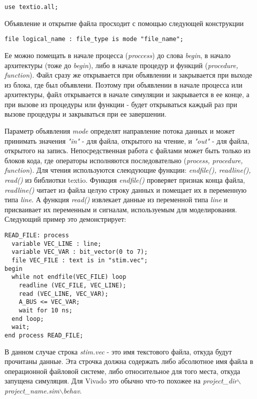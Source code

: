 \begin{lstlisting}
use textio.all;
\end{lstlisting}

Объявление и открытие файла просходит с помощью следующей конструкции

\begin{lstlisting}
file logical_name : file_type is mode "file_name";
\end{lstlisting}

Ее можно помещать в начале процесса (\emph{proccess}) до слова \emph{begin}, в начало архитектуры (тоже до \emph{begin}), либо в начале процедур и функций (\emph{procedure, function}). Файл сразу же открывается при объявлении и закрывается при выходе из блока, где был объявлени. Поэтому при объявлении в начале процесса или архитектуры, файл открывается в начале симуляции и закрывается в ее конце, а при вызове из процедуры или функции - будет открываться каждый раз при вызове процедуры и закрываться при ее завершении.

Параметр объявления \emph{mode} определят направление потока данных и может принимать значения \emph{"in"} - для файла, открытого на чтение, и \emph{"out"} - для файла, открытого на запись. Непосредственная работа с файлами может быть только из блоков кода, где операторы исполняются последовательно (\emph{process, procedure, function}). Для чтения используются слеюдующие функции: \emph{endfile(), readline(), read()} из библиотки textio. Функция \emph{endfile()} проверяет признак конца файла, \emph{readline()} читает из файла целую строку данных и помещает их в переменную типа \emph{line}. А функция \emph{read()} извлекает данные из переменной типа \emph{line} и присваивает их переменным и сигналам, используемым для моделирования. Следующий пример это демонстрирует:

\begin{Code}
\begin{lstlisting}
READ_FILE: process
  variable VEC_LINE : line;
  variable VEC_VAR : bit_vector(0 to 7);
  file VEC_FILE : text is in "stim.vec";
begin
  while not endfile(VEC_FILE) loop
    readline (VEC_FILE, VEC_LINE);
    read (VEC_LINE, VEC_VAR);
    A_BUS <= VEC_VAR;
    wait for 10 ns;
  end loop;
  wait;
end process READ_FILE;
\end{lstlisting}
\end{Code}

В данном случае строка \emph{stim.vec} - это имя текстового файла, откуда будут прочитаны данные. Эта строчка должна содержать либо абсолютное имя файла в операционной файловой системе, либо относительное для того места, откуда запущена симуляция. Для Vivado это обычно что-то похожее на \emph{project\_dir$\backslash$project\_name.sim$\backslash$behav}.

